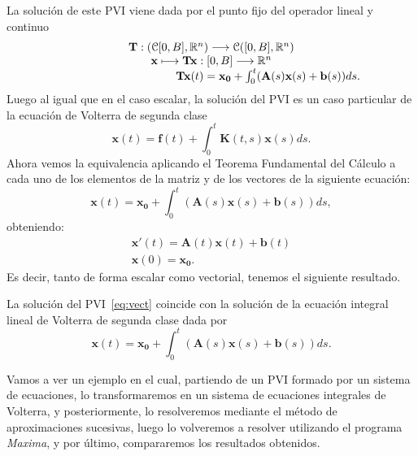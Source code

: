 La solución de este PVI viene dada por el punto fijo del operador lineal y continuo
\begin{equation}
	\begin{array}{c}
		\textbf{T}: (\mathcal{C}[0,B], \mathbb{R}^n) \longrightarrow \mathcal{C}([0,B],\mathbb{R}^n) \\  \textbf{x} \longmapsto \textbf{Tx}:[0,B] \longrightarrow \mathbb{R}^n \\  \qquad \qquad \qquad \qquad \qquad \textbf{Tx}(t)= \textbf{x}_\textbf{0} + \int_0^t (\textbf{A}(s)\textbf{x}(s)+\textbf{b}(s))ds.
	\end{array}
\end{equation}
Luego al igual que en el caso escalar, la solución del PVI es un caso particular de la ecuación de Volterra de segunda clase
\begin{equation}
	\textbf{x}(t) = \textbf{f}(t) + \int_0^t \textbf{K}(t,s)\textbf{x}(s)ds.
\end{equation}
Ahora vemos la equivalencia aplicando el Teorema Fundamental del Cálculo a cada uno de los elementos de la matriz y de los vectores de la siguiente ecuación:
\begin{equation}
	\textbf{x}(t)= \textbf{x}_\textbf{0} + \int_0^t (\textbf{A}(s)\textbf{x}(s)+\textbf{b}(s))ds,
\end{equation}
obteniendo:
\begin{equation}
	\begin{array}{c}
		\textbf{x}'(t) = \textbf{A}(t)\textbf{x}(t)+\textbf{b}(t) \\ \textbf{x}(0) = \textbf{x}_\textbf{0}.
	\end{array}
\end{equation}
Es decir, tanto de forma escalar como vectorial, tenemos el siguiente resultado.
\begin{corolario}
	La solución del PVI~\eqref{eq:vect} coincide con la solución de la ecuación integral lineal de Volterra de segunda clase dada por
	\begin{equation}
		\textbf{x}(t)= \textbf{x}_\textbf{0} + \int_0^t (\textbf{A}(s)\textbf{x}(s)+\textbf{b}(s))ds.
	\end{equation}
\end{corolario}

Vamos a ver un ejemplo en el cual, partiendo de un PVI formado por un sistema de ecuaciones, lo transformaremos en un sistema de ecuaciones integrales de Volterra, y posteriormente, lo resolveremos mediante el método de aproximaciones sucesivas, luego lo volveremos a resolver utilizando el programa \textit{Maxima}, y por último, compararemos los resultados obtenidos.

